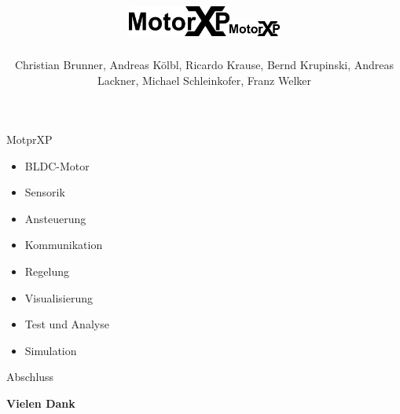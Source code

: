 \documentclass[14pt]{beamer}
\title{\includegraphics[height=1cm]{../images/MotorXP}}
\author{Christian Brunner, Andreas Kölbl, Ricardo Krause, Bernd Krupinski, Andreas Lackner, Michael Schleinkofer, Franz Welker}
\begin{document}
\begingroup
\makeatletter
\setlength{\hoffset}{-.5\beamer@sidebarwidth}
\makeatother
\begin{frame}[plain]
  \titlepage
\end{frame}
\endgroup
  \title{\includegraphics[height=0.5cm]{../images/MotorXP}}
  \author{}

\begin{frame}{MotprXP}
\begin{itemize}
	\item BLDC-Motor
	\item Sensorik
	\item Ansteuerung
	\item Kommunikation
	\item Regelung
	\item Visualisierung
	\item Test und Analyse
	\item Simulation
\end{itemize}
\end{frame}












\begin{frame}{Abschluss}
\centering 
	\begin{huge}
		\textbf{Vielen Dank}
	\end{huge}
\end{frame}
\end{document}
